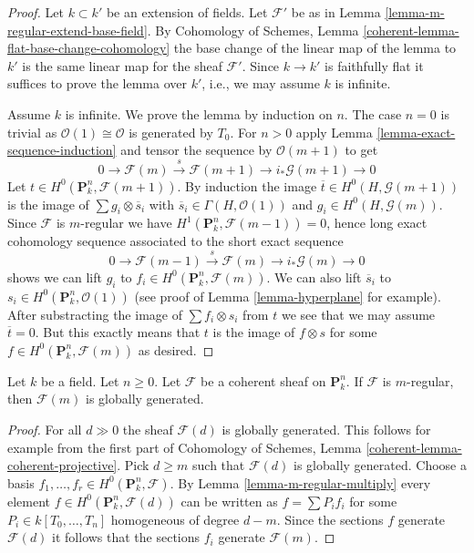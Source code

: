 \begin{proof}
Let $k \subset k'$ be an extension of fields. Let $\mathcal{F}'$
be as in Lemma \ref{lemma-m-regular-extend-base-field}. By
Cohomology of Schemes, Lemma \ref{coherent-lemma-flat-base-change-cohomology}
the base change of the linear map of the lemma to $k'$ is the
same linear map for the sheaf $\mathcal{F}'$. Since $k \to k'$
is faithfully flat it suffices to prove the lemma over $k'$, i.e.,
we may assume $k$ is infinite.

\medskip\noindent
Assume $k$ is infinite. We prove the lemma by induction on $n$.
The case $n = 0$ is trivial as $\mathcal{O}(1) \cong \mathcal{O}$
is generated by $T_0$. For $n > 0$ apply
Lemma \ref{lemma-exact-sequence-induction}
and tensor the sequence by $\mathcal{O}(m + 1)$ to get
$$
0 \to \mathcal{F}(m) \xrightarrow{s} \mathcal{F}(m + 1) \to
i_*\mathcal{G}(m + 1) \to 0
$$
Let $t \in H^0(\mathbf{P}^n_k, \mathcal{F}(m + 1))$.
By induction the image $\overline{t} \in H^0(H, \mathcal{G}(m + 1))$
is the image of $\sum g_i \otimes \overline{s}_i$ with
$\overline{s}_i \in \Gamma(H, \mathcal{O}(1))$ and
$g_i \in H^0(H, \mathcal{G}(m))$. Since $\mathcal{F}$ is $m$-regular
we have $H^1(\mathbf{P}^n_k, \mathcal{F}(m - 1)) = 0$, hence long
exact cohomology sequence associated to the short exact sequence
$$
0 \to \mathcal{F}(m - 1) \xrightarrow{s} \mathcal{F}(m) \to
i_*\mathcal{G}(m) \to 0
$$
shows we can lift $g_i$ to $f_i \in H^0(\mathbf{P}^n_k, \mathcal{F}(m))$.
We can also lift $\overline{s}_i$ to
$s_i \in H^0(\mathbf{P}^n_k, \mathcal{O}(1))$ (see proof of
Lemma \ref{lemma-hyperplane} for example). After substracting the
image of $\sum f_i \otimes s_i$ from $t$ we see that we may assume
$\overline{t} = 0$. But this exactly means that $t$ is the
image of $f \otimes s$ for some $f \in H^0(\mathbf{P}^n_k, \mathcal{F}(m))$
as desired.
\end{proof}

\begin{lemma}
\label{lemma-m-regular-globally-generated}
Let $k$ be a field. Let $n \geq 0$.
Let $\mathcal{F}$ be a coherent sheaf on $\mathbf{P}^n_k$.
If $\mathcal{F}$ is $m$-regular, then $\mathcal{F}(m)$ is
globally generated.
\end{lemma}

\begin{proof}
For all $d \gg 0$ the sheaf $\mathcal{F}(d)$ is globally generated.
This follows for example from the first part of
Cohomology of Schemes, Lemma \ref{coherent-lemma-coherent-projective}.
Pick $d \geq m$ such that $\mathcal{F}(d)$ is globally generated.
Choose a basis $f_1, \ldots, f_r \in H^0(\mathbf{P}^n_k, \mathcal{F})$.
By Lemma \ref{lemma-m-regular-multiply} every element
$f \in H^0(\mathbf{P}^n_k, \mathcal{F}(d))$ can be written as
$f = \sum P_if_i$ for some $P_i \in k[T_0, \ldots, T_n]$ homogeneous
of degree $d - m$. Since the sections $f$ generate $\mathcal{F}(d)$
it follows that the sections $f_i$ generate $\mathcal{F}(m)$.
\end{proof}

